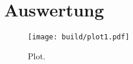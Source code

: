 \section{Auswertung}
\label{sec:Auswertung}

\begin{figure}
  \centering
  \texttt{[image: build/plot1.pdf]}
  \caption{Plot.}
  \label{fig:plot}
\end{figure}
